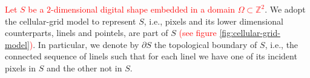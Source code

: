 \documentclass[smallextended]{svjour3}       %
\newcommand{\revision}[1]{\textcolor{red}{#1}}
\begin{document}
\revision{Let $S$ be a $2$-dimensional digital shape embedded in a domain $\Omega \subset \mathbb{Z}^2$}. We adopt the cellular-grid model to represent $S$, i.e., pixels and its lower dimensional counterparts, linels and pointels, are part of $S$ \revision{(see figure \ref{fig:cellular-grid-model})}. In particular, we denote by $\partial S$ the topological boundary of $S$, i.e., the connected sequence of linels such that for each linel we have one of its incident pixels in $S$ and the other not in $S$.

\begin{figure}[h!]
	\center
	\hspace{40pt}%
\end{figure}
\end{document}
